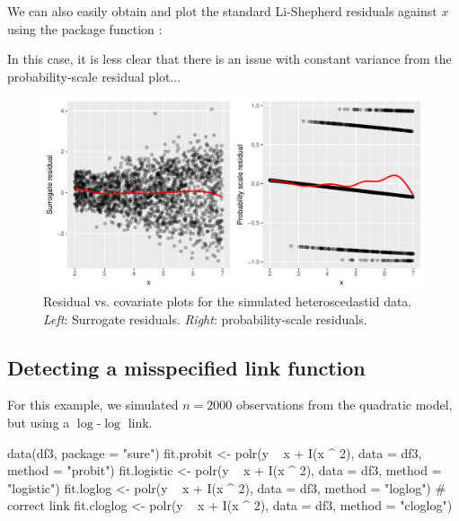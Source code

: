We can also easily obtain and plot the standard Li-Shepherd residuals against $x$ using the  package function :

In this case, it is less clear that there is an issue with constant variance from the probability-scale residual plot...

\begin{figure}[!htbp]
  \centering
  \includegraphics[width=1\textwidth]{heteroscedasticity}
  \caption{Residual vs. covariate plots for the simulated heteroscedastid data. \textit{Left}: Surrogate residuals. \textit{Right}: probability-scale residuals.}
  \label{fig:heteroscedasticity}
\end{figure}


\subsection{Detecting a misspecified link function}

For this example, we simulated $n = 2000$ observations from the quadratic model, but using a $\log$-$\log$ link.

\begin{example}
data(df3, package = "sure")
fit.probit <- polr(y ~ x + I(x ^ 2), data = df3, method = "probit")
fit.logistic <- polr(y ~ x + I(x ^ 2), data = df3, method = "logistic")
fit.loglog <- polr(y ~ x + I(x ^ 2), data = df3, method = "loglog")  # correct link
fit.cloglog <- polr(y ~ x + I(x ^ 2), data = df3, method = "cloglog")
\end{example}

